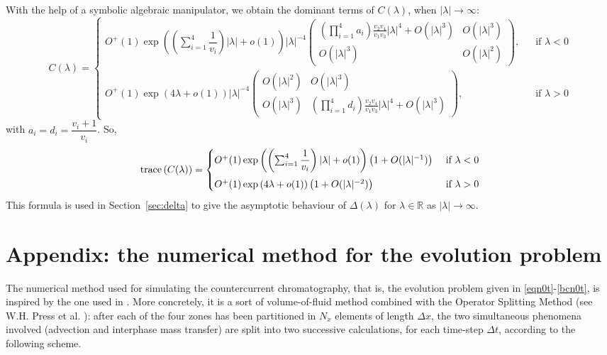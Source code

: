 \documentclass[a4paper]{article}
\numberwithin{equation}{section}
\begin{document}
With the help of a symbolic algebraic manipulator, we obtain the dominant terms of $C(\lambda)$, when $|\lambda|\to\infty$:
$$
 C(\lambda)=
 \begin{cases}
  O^+(1) \exp\left(\left(\sum_{i=1}^4\dfrac{1}{v_i}\right)|\lambda| +o(1)\right)|\lambda|^{-4}
 \begin{pmatrix} (\prod_{i=1}^{4}a_i) \frac{v_2 v_4}{v_1 v_3} |\lambda|^4+ O(|\lambda|^3)& O(|\lambda|^3)\\  O(|\lambda|^3) & O(|\lambda|^2)\end{pmatrix},\ \ &\textrm{ if } \lambda<0\\[2.75em]
 O^+(1)\exp\left(4\lambda +o(1)\right)|\lambda|^{-4}
 \begin{pmatrix} O(|\lambda|^2)& O(|\lambda|^3)\\ O(|\lambda|^3) & (\prod_{i=1}^{4}d_i) \frac{v_2 v_4}{v_1 v_3} |\lambda|^4+O(|\lambda|^3)\end{pmatrix},\ \  &\textrm{ if } \lambda>0
 \end{cases}
$$
with $a_i= d_i=\dfrac{v_i+1}{v_i}$. So,
 \begin{equation}\label{eq:traceinfinity}
 {\rm trace}\left(C(\lambda)\right) = \begin{cases} O^+(1) \exp\left(\left(\sum_{i=1}^4\dfrac{1}{v_i}\right)|\lambda|+o(1)\right)\left(1+O(|\lambda|^{-1})\right) &\textrm{ if } \lambda<0 \\[10pt]
  O^+(1) \exp\left(4\lambda +o(1)\right)\left(1+O(|\lambda|^{-2})\right) &\textrm{ if } \lambda>0\end{cases}
 \end{equation}
This formula is used in Section~\ref{sec:delta} to give the asymptotic behaviour of $\Delta(\lambda)$ for $\lambda\in\mathbb{R}$ as $|\lambda|\to\infty$.


\section{Appendix: the numerical method for the evolution problem}\label{sec:appendix3}
The numerical method used for simulating the countercurrent chromatography, that is, the evolution problem given in \eqref{eqn0t}-\eqref{bcn0t}, is inspired by the one used in \cite{Menacho2011, Menacho2013}. More concretely, it is a sort of volume-of-fluid method combined with the Operator Splitting Method (see W.H. Press et al. \cite{Pressetal}): after each of the four zones has been partitioned in $N_x$ elements of length $\Delta x$, the two simultaneous phenomena involved (advection and interphase mass transfer) are split into two successive calculations, for each time-step $\Delta t$, according to the following scheme.
\end{document}
